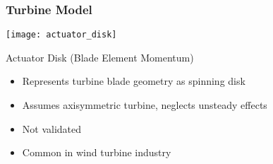 \documentclass[mathserif]{beamer}
\begin{document}
%
%
%
\begin{frame}
 \frametitle{Turbine Model}

 \begin{center}
  \texttt{[image: actuator\_disk]}
 \end{center}
 
 \begin{block}{Actuator Disk (Blade Element Momentum)}
   \begin{itemize}
   \item Represents turbine blade geometry as spinning disk
   \item Assumes axisymmetric turbine, neglects unsteady effects
   \item Not validated
   \item Common in wind turbine industry
   \end{itemize}
 \end{block}
 
\end{frame}
\end{document}
